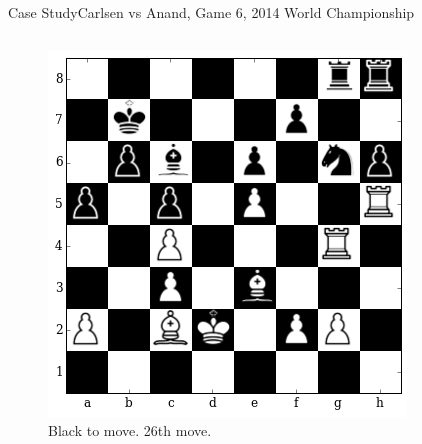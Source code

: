 \documentclass[9pt, unknownkeysallowed]{beamer}
\begin{document}
\begin{frame}{Case Study}{Carlsen vs Anand, Game 6, 2014 World 
Championship}
 \begin{columns}[c]
 \begin{column}{4cm}
  \begin{figure}[H]
  \centering
  \includegraphics[width=\textwidth]{../img/best_moves/vishy-magnus.png}
  \caption[Middle game case study]{Black to move. 26th move.}
\end{figure}
    

\end{column}
\end{columns}
\end{frame}
\end{document}
